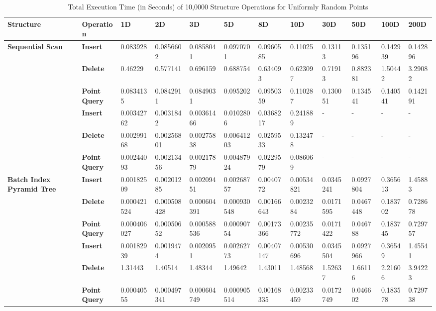 \begin{landscape}

	\begin{table}
		\centering
		\begin{tabular}{|p{2cm}|l|l|l|l|l|l|l|l|l|l|l|}
			\hline
			\textbf{Structure} & \textbf{Operation} & \textbf{1D} & \textbf{2D} & \textbf{3D} & \textbf{5D} & \textbf{8D} & \textbf{10D} & \textbf{30D} & \textbf{50D} & \textbf{100D} & \textbf{200D} \\
			\hline
			\multirow{ 4}{*}{\textbf{Sequential Scan}} & \textbf{Insert} & 0.083928 & 0.0856602 & 0.0858041 & 0.0970701 & 0.0960585 & 0.11025 & 0.13113 & 0.135196 & 0.142939 & 0.142896 \\ & \textbf{Delete} & 0.46229 & 0.577141 & 0.696159 & 0.688754 & 0.634093 & 0.623097 & 0.71913 & 0.882381 & 1.50442 & 3.29082 \\ & \textbf{Point Query} & 0.0834135 & 0.0842911 & 0.0849031 & 0.095202 & 0.0950359 & 0.110287 & 0.130051 & 0.134541 & 0.140541 & 0.142191 \\
			\hline
			\multirow{ 4}{*}{\textbf{Octree}} & \textbf{Insert} & 0.00342762 & 0.0031842 & 0.00361466 & 0.0102806 & 0.0368217 & 0.241889 & - & - & - & - \\ & \textbf{Delete} & 0.00299168 & 0.00256801 & 0.00275838 & 0.00641203 & 0.0259533 & 0.132478 & - & - & - & - \\ & \textbf{Point Query} & 0.00244093 & 0.00213456 & 0.00217879 & 0.00487924 & 0.0229579 & 0.086069 & - & - & - & - \\
			\hline
			\multirow{ 4}{*}{\textbf{Batch Index Pyramid Tree}} & \textbf{Insert} & 0.00182509 & 0.00201285 & 0.00209451 & 0.00268757 & 0.0040772 & 0.00534821 & 0.0345241 & 0.0927804 & 0.365613 & 1.45883 \\ & \textbf{Delete} & 0.000421524 & 0.000508428 & 0.000604391 & 0.000930548 & 0.00166643 & 0.0023284 & 0.0171595 & 0.0467448 & 0.183702 & 0.728678 \\ & \textbf{Point Query} & 0.000406027 & 0.00050652 & 0.000588536 & 0.00090754 & 0.00173366 & 0.00235772 & 0.0171422 & 0.046788 & 0.183745 & 0.729757 \\
			\hline
			\multirow{ 4}{*}{\textbf{Defragmented Index Pyramid Tree}} & \textbf{Insert} & 0.00182939 & 0.0019474 & 0.0020951 & 0.00262773 & 0.00407147 & 0.00530696 & 0.0345504 & 0.0927966 & 0.36549 & 1.45541 \\ & \textbf{Delete} & 1.31443 & 1.40514 & 1.48344 & 1.49642 & 1.43011 & 1.48568 & 1.52637 & 1.66116 & 2.21606 & 3.94223 \\ & \textbf{Point Query} & 0.00040555 & 0.000497341 & 0.000604749 & 0.000905514 & 0.00168335 & 0.00233459 & 0.0172749 & 0.046602 & 0.183578 & 0.729738 \\
			\hline
		\end{tabular}
		\caption{Total Execution Time (in Seconds) of 10,0000 Structure Operations for Uniformly Random Points}
		\label{tab:perf1-randuniform}
	\end{table}


\end{landscape}
